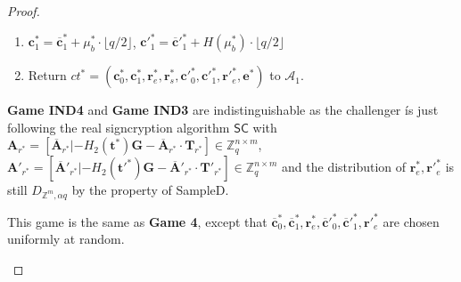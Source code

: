 \documentclass[a4paper,11pt,onecolumn]{elsarticle}
\begin{document}
\begin{proof}
\begin{description}
\begin{enumerate}
		\iffalse  follows:					
						\begin{enumerate}
						
		\item Sample $\textbf{r}^*_s\leftarrow D_{\mathbb{Z}^{m }, \alpha q}$.	%
		\item $\textbf{h}^*=(h^*_1, \cdots, h^*_n)=f_{\overline{\textbf{A}}_{s^*}}(H_3(\mu^*_b| pk_{r^*}|\overline{ct}^*))+f_{\textbf{B}}(\textbf{r}^*_{s})\in \mathbb{Z}_q^{n}$.
		\item $\textbf{A}_{s^*,\textbf{h}^*}=[\mathbf{A}_{s^*}|\mathbf{C}_0+\sum_{i=1}^{n}h^*_i\cdot \mathbf{C}_i]\in \mathbb{Z}_q^{n \times (m+nk)}$.
		\item $\textbf{e}^* \in \mathbb{Z}^{m+nk} \leftarrow \textsf{SampleD}(\textbf{T}_{s^*}, \textbf{A}_{s^*,\textbf{h}^*},\textbf{u},\sigma_2)$.
								\end{enumerate}
								\fi	
		\item  $\textbf{c}^*_1=\overline{\textbf{c}}^*_1+ \mu^*_b \cdot \lfloor q/2\rfloor$, \quad  $\textbf{c}'^*_1=\overline{\textbf{c}}'^*_1+ H(\mu^*_b) \cdot \lfloor q/2\rfloor$	
		 
				\item Return $ct^*=(\textbf{c}^*_0, \textbf{c}^*_1, \textbf{r}^*_{e},\textbf{r}^*_{s},\textbf{c}'^*_0, \textbf{c}'^*_1,\textbf{r}'^*_e, \textbf{e}^*)$ to $\mathcal{A}_1$.
			  	\end{enumerate}
			  	
			  	
			\item  \textbf{Game IND4} and \textbf{Game IND3} are indistinguishable as the challenger ís just following the real signcryption algorithm $\textsf{SC}$ with  $\mathbf{A}_{r^*}=[\overline{\mathbf{A}}_{r^*}|-H_2(\textbf{t}^*)\mathbf{G}-\overline{\mathbf{A}}_{r^*}\cdot \mathbf{T}_{r^*}] \in \mathbb{Z}_q^{n \times m}$, $\mathbf{A}'_{r^*}=[\overline{\mathbf{A}}'_{r^*}|-H_2(\textbf{t}'^*)\mathbf{G}-\overline{\mathbf{A}}'_{r^*}\cdot \mathbf{T}'_{r^*}] \in \mathbb{Z}_q^{n \times m}$ and the distribution of $\textbf{r}^*_e, \textbf{r}'^*_e $ is still $ D_{\mathbb{Z}^{m }, \alpha q}$ by the property of \textsf{SampleD}.   	  			 		
			  			 		
			   \item[Game IND5.] This game is the same as \textbf{Game 4}, except that $\overline{\textbf{c}}^*_0, \overline{\textbf{c}}^*_1, \textbf{r}^*_e, \overline{\textbf{c}}'^*_0, \overline{\textbf{c}}'^*_1, \textbf{r}'^*_e$ are  chosen uniformly at random. 
			  

\end{description}
\end{proof}
\end{document}
